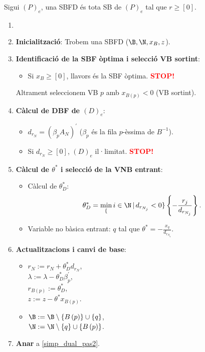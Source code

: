\begin{defi}
    Sigui $\left(P\right)_e$, una SBFD és tota SB de $\left(P\right)_e$ tal que $r \geq \left[0\right]$.
\end{defi}

\begin{alg}
    \begin{enumerate}
        \item[]
        \item {\bf Inicialització}: Trobem una SBFD ($\B, \N, x_B, z$).
        \item \label{simp_dual_pas2} {\bf Identificació de la SBF òptima i selecció VB sortint}:
            \begin{itemize}
                \item Si $x_B \geq \left[0\right]$, llavors és la SBF òptima. \textcolor{red}{\bf STOP!}
            \end{itemize}
            Altrament seleccionem VB $p$ amb $x_{B\left(p\right)} < 0$ (VB sortint).
        \item {\bf Càlcul de DBF de $\left(D\right)_e$}:
            \begin{itemize}
                \item $d_{r_N} = \left(\beta_p A_N\right)^\prime$ ($\beta_p$ és la fila $p$-èssima de $B^{-1}$).
                \item Si $d_{r_N} \geq \left[0\right]$, $\left(D\right)_e$ il·limitat. \textcolor{red}{\bf STOP!}
            \end{itemize}
        \item {\bf Càlcul de $\theta^*$ i selecció de la VNB entrant}:
            \begin{itemize}
                \item Càlcul de $\theta_D^*$: 
                    \[\theta_D^* = \min_\{i \in \N \,|\, d_{r_{N_j}} < 0\} \left\{-\frac{r_j}{d_{r_{N_j}}} \right\}.\]
                \item Variable no bàsica entrant: $q$ tal que $\theta^* = -\frac{x_q}{d_{r_{N_q}}}$.
            \end{itemize}
        \item {\bf Actualitzacions i canvi de base}:
            \begin{itemize}
                \item $r_N := r_N + \theta_D^* d_{r_N}$, \\
                    $\lambda := \lambda - \theta_D^* \beta_p^\prime$, \\
                    $r_{B\left(p\right)} := \theta_D^*$, \\
                    $z := z - \theta^* x_{B\left(p\right)}$.
                \item $\B := \B \setminus \left\{B\left(p\right)\right\} \cup \left\{q\right\}$, \\
                    $\N := \N \setminus \left\{q\right\} \cup \left\{B\left(p\right)\right\}$.
            \end{itemize}
        \item {\bf Anar} a \ref{simp_dual_pas2}.
    \end{enumerate}
\end{alg}

